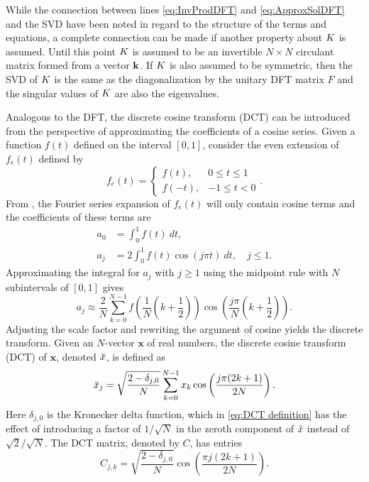 While the connection between lines \eqref{eq:InvProdDFT} and \eqref{eq:ApproxSolDFT} and the SVD have been noted in regard to the structure of the terms and equations, a complete connection can be made if another property about $K$ is assumed. Until this point $K$ is assumed to be an invertible $N \times N$ circulant matrix formed from a vector $\mathbf{k}$. If $K$ is also assumed to be symmetric, then the SVD of $K$ is the same as the diagonalization by the unitary DFT matrix $F$ and the singular values of $K$ are also the eigenvalues. \par 
Analogous to the DFT, the discrete cosine transform (DCT) can be introduced from the perspective of approximating the coefficients of a cosine series. Given a function $f(t)$ defined on the interval $[0,1]$, consider the even extension of $f_e(t)$ defined by
\[f_e(t) = \begin{cases}
f(t), & 0 \leq t \leq 1 \\
f(-t), & -1 \leq t < 0
\end{cases}.\]
From \cite[p.~49]{BoggessNarcowich2009}, the Fourier series expansion of $f_e(t)$ will only contain cosine terms and the coefficients of these terms are
\begin{align*}
a_0 &= \int_0^1 f(t)~dt, \\
a_j &= 2\int_0^1 f(t) \cos(j\pi{t})~dt, \quad j \leq 1.
\end{align*}
Approximating the integral for $a_j$ with $j \geq 1$ using the midpoint rule with $N$ subintervals of $[0,1]$ gives
\[a_j \approx \frac{2}{N}\sum_{k=0}^{N-1} f\left(\frac{1}{N}\left(k+\frac{1}{2}\right)\right)\cos\left(\frac{j\pi}{N}\left(k+\frac{1}{2}\right)\right).\]
Adjusting the scale factor and rewriting the argument of cosine yields the discrete transform. Given an $N$-vector $\mathbf{x}$ of real numbers, the discrete cosine transform (DCT) of $\mathbf{x}$, denoted $\breve{x}$, is defined as
\begin{equation}
\label{eq:DCT definition}
\breve{x}_j = \sqrt{\frac{2 - \delta_{j,0}}{N}} \sum_{k=0}^{N-1} x_k\cos\left(\frac{j\pi(2k + 1)}{2N}\right).
\end{equation}
Here $\delta_{j,0}$ is the Kronecker delta function, which in \eqref{eq:DCT definition} has the effect of introducing a factor of $1/\sqrt{N}$ in the zeroth component of $\breve{x}$ instead of $\sqrt{2}/\sqrt{N}$. The DCT matrix, denoted by $C$, has entries
\begin{equation}
\label{eq:DCT matrix}
C_{j,k} = \sqrt{\frac{2 - \delta_{j,0}}{N}} \cos\left(\frac{\pi{j}(2k + 1)}{2N}\right).
\end{equation}
